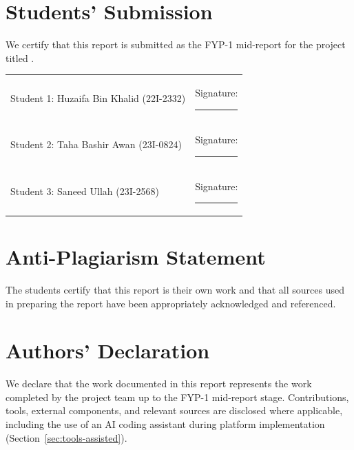 \chapter*{Students' Submission}
\thispagestyle{plain}
We certify that this report is submitted as the FYP-1 mid-report for the project titled
\textit{\projecttitle}.

\vspace{1.2cm}
\begin{tabular}{p{7cm}l}
Student 1: Huzaifa Bin Khalid (22I-2332) & Signature: \rule{4.5cm}{0.4pt}\\[1.6cm]
Student 2: Taha Bashir Awan (23I-0824) & Signature: \rule{4.5cm}{0.4pt}\\[1.6cm]
Student 3: Saneed Ullah (23I-2568) & Signature: \rule{4.5cm}{0.4pt}\\
\end{tabular}

\chapter*{Anti-Plagiarism Statement}
\thispagestyle{plain}
The students certify that this report is their own work and that all sources used in preparing
the report have been appropriately acknowledged and referenced.

\chapter*{Authors' Declaration}
\thispagestyle{plain}
We declare that the work documented in this report represents the work completed by the
project team up to the FYP-1 mid-report stage. Contributions, tools, external components,
and relevant sources are disclosed where applicable, including the use of an AI coding
assistant during platform implementation (Section~\ref{sec:tools-assisted}).

